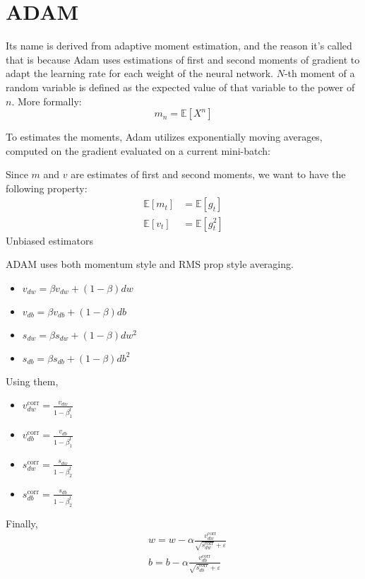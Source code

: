 \section{ADAM}
Its name is derived from adaptive moment estimation, and the reason it's called that is because Adam uses estimations of first and second moments of gradient to adapt the learning rate for each weight of the neural network. $N$-th moment of a random variable is defined as the expected value of that variable to the power of $n$. More formally:
$$m_n = \mathbb{E}[X^n]$$

To estimates the moments, Adam utilizes exponentially moving averages, computed on the gradient evaluated on a current mini-batch:

Since $m$ and $v$ are estimates of first and second moments, we want to have the following property:
\begin{align}
	\mathbb{E}[m_t] &= \mathbb{E}[g_t]\\
	\mathbb{E}[v_t] &= \mathbb{E}[g_t^2]
\end{align}
Unbiased estimators

ADAM uses both momentum style and RMS prop style averaging. 
\begin{itemize}
	\item $v_{dw} = \beta v_{dw} + (1-\beta)dw$
	\item $v_{db} = \beta v_{db} + (1-\beta)db$
	\item $s_{dw} = \beta s_{dw} + (1-\beta)dw^2 $
	\item $s_{db} = \beta s_{db} + (1-\beta)db^2 $
\end{itemize}

Using them,
\begin{itemize}
	\item $ v^{\textrm{corr}}_{dw} = \frac{v_{dw}}{1-\beta_1^t}$
	\item $ v^{\textrm{corr}}_{db} = \frac{v_{db}}{1-\beta_1^t}$
	\item $ s^{\textrm{corr}}_{dw} = \frac{s_{dw}}{1-\beta_2^t}$
	\item $ s^{\textrm{corr}}_{db} = \frac{s_{db}}{1-\beta_2^t}$
\end{itemize}

Finally, 
\begin{align*}
	& w = w-\alpha  \frac{v^{\textrm{corr}}_{dw}}{\sqrt{s^{\textrm{corr}}_{dw}}+\varepsilon}\\
	& b = b-\alpha  \frac{v^{\textrm{corr}}_{db}}{\sqrt{s^{\textrm{corr}}_{db}}+\varepsilon}\\
\end{align*}




